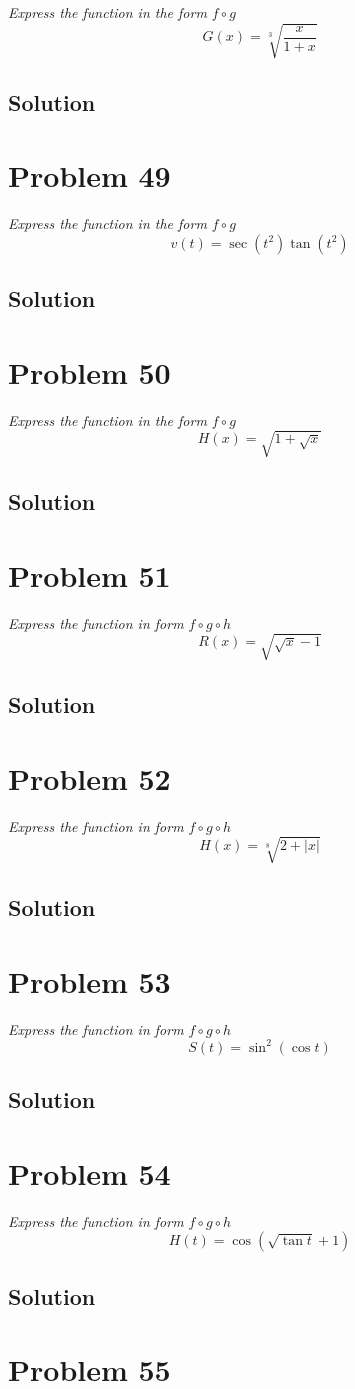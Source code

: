 \documentclass[11pt]{article}
\newcommand{\soln}{\subsection*}
\newcommand{\qn}{\textit}
\begin{document}
\qn{Express the function in the form $f \circ g$ $$G(x)=\sqrt[3]{\frac{x}{1+x}}$$}

\soln{Solution}

\section*{Problem 49}

\qn{Express the function in the form $f \circ g$ $$v(t)=\sec(t^2)\tan(t^2)$$}

\soln{Solution}

\section*{Problem 50}

\qn{Express the function in the form $f \circ g$ $$H(x)=\sqrt{1+\sqrt{x}}$$}

\soln{Solution}

\section*{Problem 51}

\qn{Express the function in form $f \circ g \circ h$ $$R(x)=\sqrt{\sqrt{x}-1}$$}

\soln{Solution}

\section*{Problem 52}

\qn{Express the function in form $f \circ g \circ h$ $$H(x)=\sqrt[8]{2+|x|}$$}

\soln{Solution}

\section*{Problem 53}

\qn{Express the function in form $f \circ g \circ h$ $$S(t)=\sin^2(\cos{t})$$}

\soln{Solution}

\section*{Problem 54}

\qn{Express the function in form $f \circ g \circ h$ $$H(t)=\cos(\sqrt{\tan{t}}+1)$$}

\soln{Solution}

\section*{Problem 55}
\end{document}

